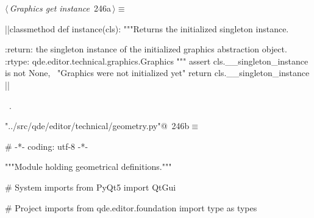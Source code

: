 \documentclass[%
    a4paper,    %
    justified,  %
    nobib,      %
    openany     %
]{tufte-book}
\makeatletter
\renewcommand{\label}[1]{\@tufte@label{##1}}%
\makeatother
\begin{document}
\begin{fullwidth}
\begin{flushleft}
\begin{minipage}{\linewidth}
\begin{list}{}{\setlength{\itemsep}{-\parsep}\setlength{\itemindent}{-\leftmargin}}
\item{}
\end{list}
\end{minipage}\vspace{4ex}
\end{flushleft}
\begin{flushleft} \small
\begin{minipage}{\linewidth}\label{scrap267}\raggedright\small
{} $\langle\,${\itshape Graphics get instance}\nobreak\ {\footnotesize {246a}}$\,\rangle\equiv$
\vspace{-1ex}
\begin{pythoncode}
|\normalfont{}\fontfamily{}|classmethod
def instance(cls):
    """Returns the initialized singleton instance.

    :return: the singleton instance of the initialized graphics abstraction
             object.
    :rtype:  qde.editor.technical.graphics.Graphics
    """
    assert cls.__singleton_instance is not None, \
        "Graphics were not initialized yet"
    return cls.__singleton_instance
|\NWsep|
\end{pythoncode}
\vspace{1.5ex}
\footnotesize
\begin{list}{}{\setlength{\itemsep}{-\parsep}\setlength{\itemindent}{-\leftmargin}}
\item \NWtxtMacroRefIn\ \NWlink{nuweb224}{224}.

\item{}
\end{list}
\end{minipage}\vspace{4ex}
\end{flushleft}

\begin{flushleft} \small
\begin{minipage}{\linewidth}\label{scrap268}\raggedright\small
{} \verb@"../src/qde/editor/technical/geometry.py"@\nobreak\ {\footnotesize {246b}}$\equiv$
\vspace{-1ex}
\begin{pythoncode}
# -*- coding: utf-8 -*-

"""Module holding geometrical definitions."""

# System imports
from PyQt5 import QtGui

# Project imports
from qde.editor.foundation import type as types



\end{pythoncode}
\end{minipage}
\end{flushleft}
\end{fullwidth}
\end{document}
